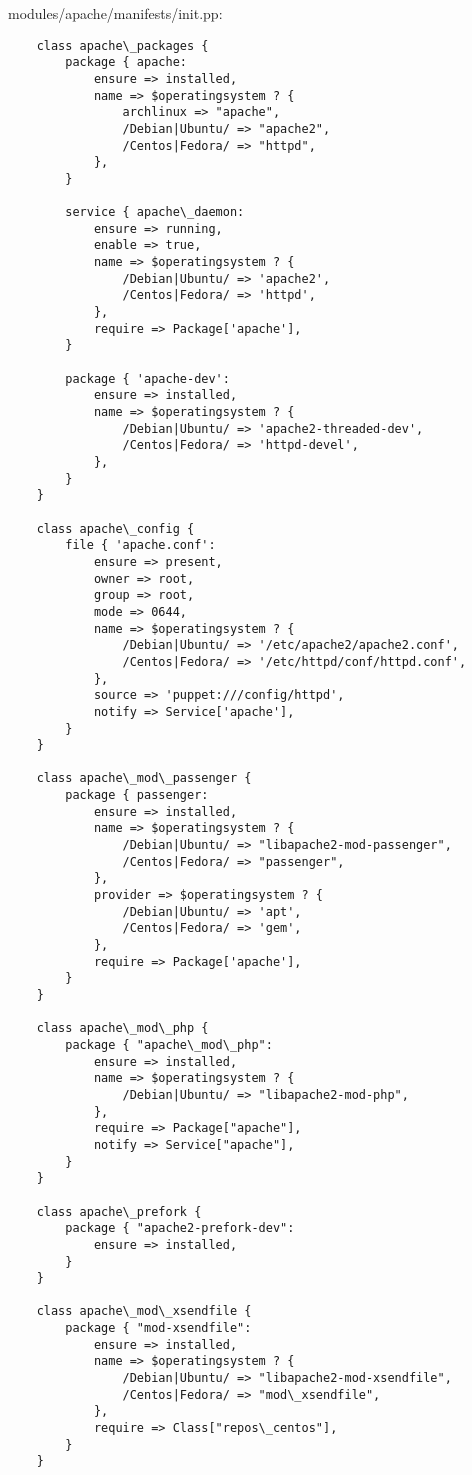 modules/apache/manifests/init.pp:
\begin{verbatim}
	class apache\_packages {
		package { apache:
			ensure => installed,
			name => $operatingsystem ? {
				archlinux => "apache",
				/Debian|Ubuntu/ => "apache2",
				/Centos|Fedora/ => "httpd",
			},
		}

		service { apache\_daemon:
			ensure => running,
			enable => true,
			name => $operatingsystem ? {
				/Debian|Ubuntu/ => 'apache2',
				/Centos|Fedora/ => 'httpd',
			},
			require => Package['apache'],
		}

		package { 'apache-dev':
			ensure => installed,
			name => $operatingsystem ? {
				/Debian|Ubuntu/ => 'apache2-threaded-dev',
				/Centos|Fedora/ => 'httpd-devel',
			},
		}
	}

	class apache\_config {
		file { 'apache.conf':
			ensure => present,
			owner => root,
			group => root,
			mode => 0644,
			name => $operatingsystem ? {
				/Debian|Ubuntu/ => '/etc/apache2/apache2.conf',
				/Centos|Fedora/ => '/etc/httpd/conf/httpd.conf',
			},
			source => 'puppet:///config/httpd',
			notify => Service['apache'],
		}
	}

	class apache\_mod\_passenger {
		package { passenger:
			ensure => installed,
			name => $operatingsystem ? {
				/Debian|Ubuntu/ => "libapache2-mod-passenger",
				/Centos|Fedora/ => "passenger",
			},
			provider => $operatingsystem ? {
				/Debian|Ubuntu/ => 'apt',
				/Centos|Fedora/ => 'gem',
			},
			require => Package['apache'],
		}
	}

	class apache\_mod\_php {
		package { "apache\_mod\_php":
			ensure => installed,
			name => $operatingsystem ? {
				/Debian|Ubuntu/ => "libapache2-mod-php",
			},
			require => Package["apache"],
			notify => Service["apache"],
		}
	}

	class apache\_prefork {
		package { "apache2-prefork-dev":
			ensure => installed,
		}
	}

	class apache\_mod\_xsendfile {
		package { "mod-xsendfile":
			ensure => installed,
			name => $operatingsystem ? {
				/Debian|Ubuntu/ => "libapache2-mod-xsendfile",
				/Centos|Fedora/ => "mod\_xsendfile",
			},
			require => Class["repos\_centos"],
		}
	}
\end{verbatim}

